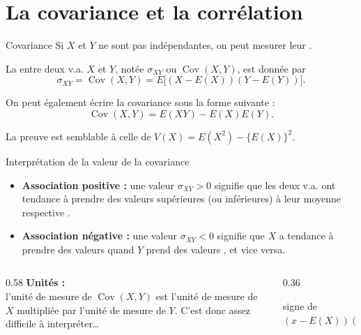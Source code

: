 \documentclass{BeamerTemplate}
\newcommand{\Cov}{\operatorname{Cov}}
\begin{document}
\section{La covariance et la corrélation}

\begin{frame}[t]{Covariance}
Si $X$ et $Y$ ne sont pas indépendantes, on peut mesurer leur .

\begin{defn}{}
 La  entre deux v.a. $X$ et $Y$, notée $\sigma_{XY}$ ou $\Cov(X,Y)$, est donnée par
 $$\sigma_{XY}=\Cov(X,Y)=E\big[(X-E(X))(Y-E(Y))\big].$$
\end{defn}

\vspace{0.1in}
On peut également écrire la covariance sous la forme suivante :
$$ \Cov(X,Y) = E(XY)-E(X)E(Y).$$

La preuve est semblable à celle de $V(X) = E(X^2) - \{E(X)\}^2$.

\end{frame}


\begin{frame}[t]{Interprétation de la valeur de la covariance}
\begin{itemize}\itemsep4pt
 \item \textbf{Association positive :} une valeur $\sigma_{XY}>0$ signifie que les deux v.a. ont
 tendance à prendre des valeurs supérieures (ou inférieures) à leur moyenne respective
 .
 \item \textbf{Association négative :} une valeur $\sigma_{XY}<0$ signifie que $X$ a tendance à
 prendre des valeurs  quand $Y$ prend des valeurs
 , et vice versa.
\end{itemize}

\begin{columns}[T]
\begin{column}{0.58\textwidth}
\textbf{Unités :}\\
l'unité de mesure de $\Cov(X,Y)$ est l'unité de mesure de $X$ multipliée par l'unité de mesure de $Y$.
C'est donc assez difficile à interpréter\ldots
\end{column}
\begin{column}{0.36\textwidth}
\centering
{}

{\tiny signe de $(x-E(X))(y-E(Y))$}
\end{column}
\end{columns}
\end{frame}
\end{document}
